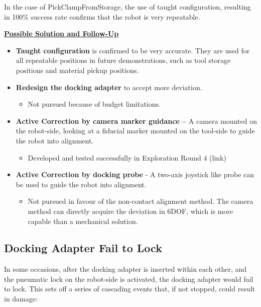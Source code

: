 In the case of PickClampFromStorage, the use of taught configuration, resulting in 100$\%$ success rate confirms that the robot is very repeatable. 

\textbf{\ul{Possible Solution and Follow-Up}}

\begin{itemize}
	\item \textbf{Taught configuration} is confirmed to be very accurate. They are used for all repeatable positions in future demonstrations, such as tool storage positions and material pickup positions.

	\item \textbf{Redesign the docking adapter} to accept more deviation.

\begin{itemize}
	\item Not pursued because of budget limitations.

\end{itemize}
	\item \textbf{Active Correction by camera marker guidance --} A camera mounted on the robot-side, looking at a fiducial marker mounted on the tool-side to guide the robot into alignment.

\begin{itemize}
	\item Developed and tested successfully in Exploration Round 4 (link)

\end{itemize}
	\item  \textbf{Active Correction by docking probe} - A two-axis joystick like probe can be used to guide the robot into alignment.

\begin{itemize}
	\item Not pursued in favour of the non-contact alignment method. The camera method can directly acquire the deviation in 6DOF, which is more capable than a mechanical solution.

\end{itemize}
\end{itemize}

\subsection{Docking Adapter Fail to Lock}
\label{subsection:exploration-3-docking-adapter-fail-to-lock}

In some occasions, after the docking adapter is inserted within each other, and the pneumatic lock on the robot-side is activated, the docking adapter would fail to lock. This sets off a series of cascading events that, if not stopped, could result in damage:

